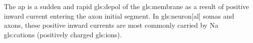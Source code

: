 \documentclass[../../Orator]{subfiles}
\begin{document}

The \gls{ap} is a sudden and rapid \gls{gls:depol} of the \gls{gls:membrane} as a result of positive inward current entering the axon initial segment. In \gls{gls:neuron}[al] somas and axons, these positive inward currents are most commonly carried by \gls{Na} \glspl{gls:cation} (positively charged \glspl{gls:ion}).
\end{document}

